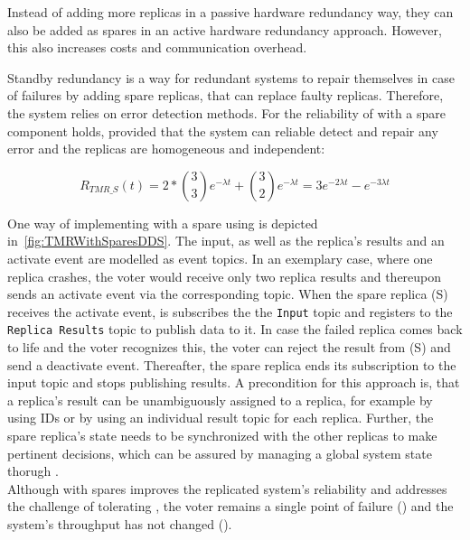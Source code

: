 Instead of adding more replicas in a passive hardware redundancy way, they can also be added as spares in an active hardware redundancy approach.
However, this also increases costs and communication overhead.

Standby redundancy is a way for redundant systems to repair themselves in case of failures by adding spare replicas, that can replace faulty replicas.
Therefore, the system relies on error detection methods.
For the reliability of  with a spare component holds, provided that the system can reliable detect and repair any error and the replicas are homogeneous and independent:

\begin{equation}
R_{TMR\_S}(t) = 2 * {3 \choose 3} e^{-\lambda t} + {3 \choose 2} e^{-\lambda t}
 = 3e^{-2 \lambda t} - e^{-3 \lambda t}
\end{equation}

One way of implementing  with a spare using  is depicted in~\autoref{fig:TMRWithSparesDDS}.
The input, as well as the replica's results and an activate event are modelled as  event topics.
In an exemplary case, where one replica crashes, the voter would receive only two replica results and thereupon sends an activate event via the corresponding topic.
When the spare replica (S) receives the activate event, is subscribes the the \texttt{Input} topic and registers to the \texttt{Replica Results} topic to publish data to it.
In case the failed replica comes back to life and the voter recognizes this, the voter can reject the result from (S) and send a deactivate event.
Thereafter, the spare replica ends its subscription to the input topic and stops publishing results.
A precondition for this approach is, that a replica's result can be unambiguously assigned to a replica, for example by using IDs or by using an individual result topic for each replica.
Further, the spare replica's state needs to be synchronized with the other replicas to make pertinent decisions, which can be assured by managing a global system state thorugh .
\\

Although  with spares improves the replicated system's reliability and addresses the challenge of tolerating \ChallengeWR, the voter remains a single point of failure (\ChallengeVoter) and the system's throughput has not changed (\ChallengeThrough).

